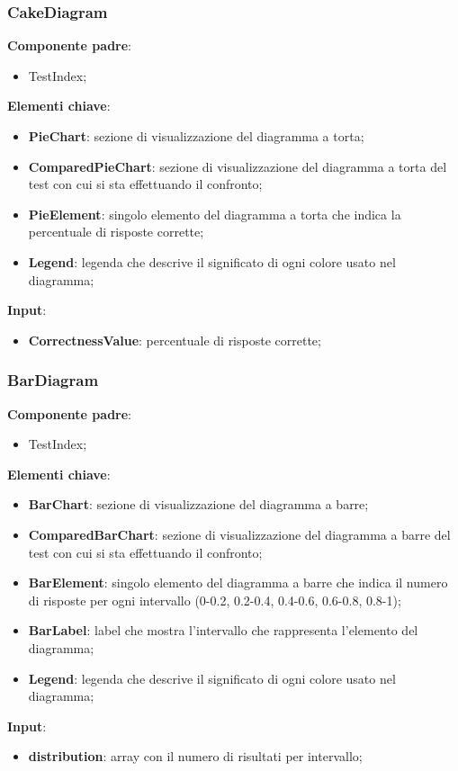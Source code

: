 \subsubsection{CakeDiagram}
\textbf{Componente padre}:
\begin{itemize}
    \item TestIndex;
\end{itemize}
\textbf{Elementi chiave}:
\begin{itemize}
    \item \textbf{PieChart}: sezione di visualizzazione del diagramma a torta;
    \item \textbf{ComparedPieChart}: sezione di visualizzazione del diagramma a torta del test con cui si sta effettuando il confronto;
    \item \textbf{PieElement}: singolo elemento del diagramma a torta che indica la percentuale di risposte corrette;
    \item \textbf{Legend}: legenda che descrive il significato di ogni colore usato nel diagramma;
\end{itemize}
\textbf{Input}:
\begin{itemize}
    \item \textbf{CorrectnessValue}: percentuale di risposte corrette;
\end{itemize}
\subsubsection{BarDiagram}
\textbf{Componente padre}:
\begin{itemize}
    \item TestIndex;
\end{itemize}
\textbf{Elementi chiave}:
\begin{itemize}
    \item \textbf{BarChart}: sezione di visualizzazione del diagramma a barre;
    \item \textbf{ComparedBarChart}: sezione di visualizzazione del diagramma a barre del test con cui si sta effettuando il confronto;
    \item \textbf{BarElement}: singolo elemento del diagramma a barre che indica il numero di risposte per ogni intervallo (0-0.2, 0.2-0.4, 0.4-0.6, 0.6-0.8, 0.8-1);
    \item \textbf{BarLabel}: label che mostra l'intervallo che rappresenta l'elemento del diagramma;
    \item \textbf{Legend}: legenda che descrive il significato di ogni colore usato nel diagramma;
\end{itemize}
\textbf{Input}:
\begin{itemize}
    \item \textbf{distribution}: array con il numero di risultati per intervallo;
\end{itemize}

